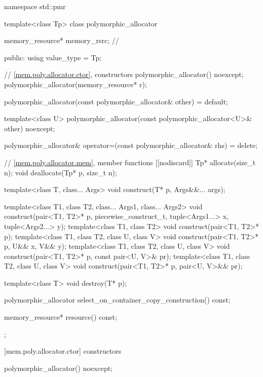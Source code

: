 %
%
\begin{codeblock}
namespace std::pmr {
  template<class Tp>
    class polymorphic_allocator {
      memory_resource* memory_rsrc;     // \expos

    public:
      using value_type = Tp;

      // \ref{mem.poly.allocator.ctor}, constructors
      polymorphic_allocator() noexcept;
      polymorphic_allocator(memory_resource* r);

      polymorphic_allocator(const polymorphic_allocator& other) = default;

      template<class U>
        polymorphic_allocator(const polymorphic_allocator<U>& other) noexcept;

      polymorphic_allocator& operator=(const polymorphic_allocator& rhs) = delete;

      // \ref{mem.poly.allocator.mem}, member functions
      [[nodiscard]] Tp* allocate(size_t n);
      void deallocate(Tp* p, size_t n);

      template<class T, class... Args>
        void construct(T* p, Args&&... args);

      template<class T1, class T2, class... Args1, class... Args2>
        void construct(pair<T1, T2>* p, piecewise_construct_t,
                       tuple<Args1...> x, tuple<Args2...> y);
      template<class T1, class T2>
        void construct(pair<T1, T2>* p);
      template<class T1, class T2, class U, class V>
        void construct(pair<T1, T2>* p, U&& x, V&& y);
      template<class T1, class T2, class U, class V>
        void construct(pair<T1, T2>* p, const pair<U, V>& pr);
      template<class T1, class T2, class U, class V>
        void construct(pair<T1, T2>* p, pair<U, V>&& pr);

      template<class T>
        void destroy(T* p);

      polymorphic_allocator select_on_container_copy_construction() const;

      memory_resource* resource() const;
    };
}
\end{codeblock}

[mem.poly.allocator.ctor]{ constructors}

%
\begin{itemdecl}
polymorphic_allocator() noexcept;
\end{itemdecl}

